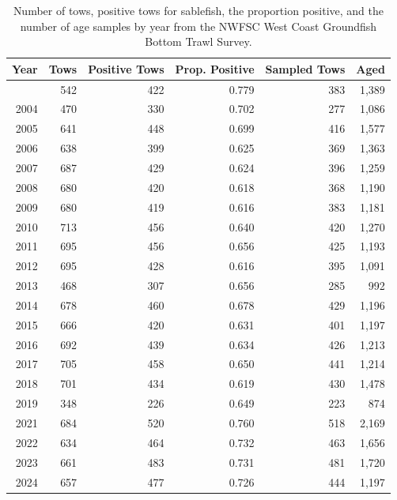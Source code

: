 \documentclass[
  english,
]{article}
\begin{document}
\endgroup

\pagebreak

\begingroup
\fontsize{9.0pt}{11.0pt}\selectfont

\begin{longtable}{rrrrrr}

\caption{\label{tbl-wcgbt-samples}Number of tows, positive tows for
sablefish, the proportion positive, and the number of age samples by
year from the NWFSC West Coast Groundfish Bottom Trawl Survey.}

\tabularnewline

\toprule
Year & Tows & Positive Tows & Prop. Positive & Sampled Tows & Aged \\ 
\midrule\addlinespace[2.5pt]
2003 & 542 & 422 & 0.779 & 383 & 1,389 \\ 
2004 & 470 & 330 & 0.702 & 277 & 1,086 \\ 
2005 & 641 & 448 & 0.699 & 416 & 1,577 \\ 
2006 & 638 & 399 & 0.625 & 369 & 1,363 \\ 
2007 & 687 & 429 & 0.624 & 396 & 1,259 \\ 
2008 & 680 & 420 & 0.618 & 368 & 1,190 \\ 
2009 & 680 & 419 & 0.616 & 383 & 1,181 \\ 
2010 & 713 & 456 & 0.640 & 420 & 1,270 \\ 
2011 & 695 & 456 & 0.656 & 425 & 1,193 \\ 
2012 & 695 & 428 & 0.616 & 395 & 1,091 \\ 
2013 & 468 & 307 & 0.656 & 285 & 992 \\ 
2014 & 678 & 460 & 0.678 & 429 & 1,196 \\ 
2015 & 666 & 420 & 0.631 & 401 & 1,197 \\ 
2016 & 692 & 439 & 0.634 & 426 & 1,213 \\ 
2017 & 705 & 458 & 0.650 & 441 & 1,214 \\ 
2018 & 701 & 434 & 0.619 & 430 & 1,478 \\ 
2019 & 348 & 226 & 0.649 & 223 & 874 \\ 
2021 & 684 & 520 & 0.760 & 518 & 2,169 \\ 
2022 & 634 & 464 & 0.732 & 463 & 1,656 \\ 
2023 & 661 & 483 & 0.731 & 481 & 1,720 \\ 
2024 & 657 & 477 & 0.726 & 444 & 1,197 \\ 
\bottomrule

\end{longtable}
\end{document}
